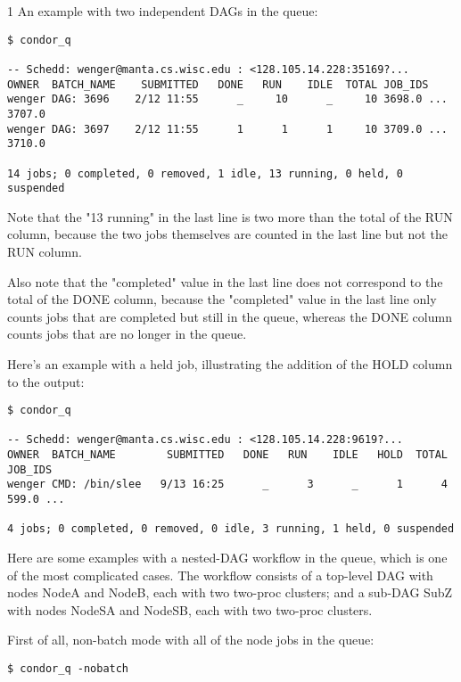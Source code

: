 \begin{ManPage}{\label{man-condor-q}}{1}
An example with two independent DAGs in the queue:
\footnotesize
\begin{verbatim}
$ condor_q

-- Schedd: wenger@manta.cs.wisc.edu : <128.105.14.228:35169?...
OWNER  BATCH_NAME    SUBMITTED   DONE   RUN    IDLE  TOTAL JOB_IDS
wenger DAG: 3696    2/12 11:55      _     10      _     10 3698.0 ... 3707.0
wenger DAG: 3697    2/12 11:55      1      1      1     10 3709.0 ... 3710.0

14 jobs; 0 completed, 0 removed, 1 idle, 13 running, 0 held, 0 suspended
\end{verbatim}
\normalsize

Note that the "13 running" in the last line is two more than the
total of the RUN column, because the two  jobs
themselves are counted in the last line but not the RUN column.

Also note that the "completed" value in the last line does not
correspond to the total of the DONE column, because the "completed"
value in the last line only counts jobs that are completed but still
in the queue, whereas the DONE column counts jobs that are no
longer in the queue.


Here's an example with a held job, illustrating the addition of
the HOLD column to the output:

\footnotesize
\begin{verbatim}
$ condor_q

-- Schedd: wenger@manta.cs.wisc.edu : <128.105.14.228:9619?...
OWNER  BATCH_NAME        SUBMITTED   DONE   RUN    IDLE   HOLD  TOTAL JOB_IDS
wenger CMD: /bin/slee   9/13 16:25      _      3      _      1      4 599.0 ...

4 jobs; 0 completed, 0 removed, 0 idle, 3 running, 1 held, 0 suspended
\end{verbatim}
\normalsize


Here are some examples with a nested-DAG workflow in the queue, which
is one of the most complicated cases.  The workflow consists of a 
top-level DAG with nodes NodeA and NodeB, each with two two-proc clusters;
and a sub-DAG SubZ with nodes NodeSA and NodeSB, each with two two-proc
clusters.

First of all, non-batch mode with all of the node jobs in the queue:

\footnotesize
\begin{verbatim}
$ condor_q -nobatch


\end{verbatim}
\end{ManPage}
